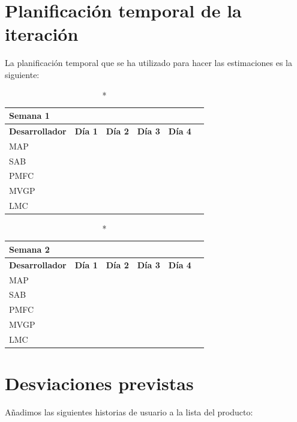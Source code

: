 \documentclass[11pt]{article}
\begin{document}
\section{Planificación temporal de la iteración}
La planificación temporal que se ha utilizado para hacer las estimaciones es la siguiente:


\begin{longtable}{lrrrrr}
  \caption*{Semana 1}\\
  \toprule
  \textbf{Desarrollador} & \textbf{Día 1} & \textbf{Día 2} & \textbf{Día 3} & \textbf{Día 4} \\
  \midrule
  MAP &  & \\
  SAB &  & \\
  PMFC \\
  MVGP & & \\
  LMC \\
  \bottomrule
\end{longtable}

\begin{longtable}{lrrrrr}
  \caption*{Semana 2}\\
  \toprule
  \textbf{Desarrollador} & \textbf{Día 1} & \textbf{Día 2} & \textbf{Día 3} & \textbf{Día 4} \\
  \midrule
  MAP &  & \\
  SAB &  & \\
  PMFC \\
  MVGP & & \\
  LMC \\
  \bottomrule
\end{longtable}

\section{Desviaciones previstas}

Añadimos las siguientes historias de usuario a la lista del producto:
\end{document}
